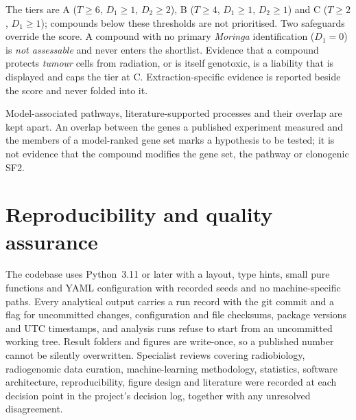 The tiers are A ($T\ge 6$, $D_1\ge 1$, $D_2\ge 2$), B ($T\ge 4$, $D_1\ge 1$, $D_2\ge 1$) and C
($T\ge 2$, $D_1\ge 1$); compounds below these thresholds are not prioritised. Two safeguards
override the score. A compound with no primary \textit{Moringa} identification ($D_1=0$) is
\emph{not assessable} and never enters the shortlist. Evidence that a compound protects
\emph{tumour} cells from radiation, or is itself genotoxic, is a liability that is displayed
and caps the tier at C. Extraction-specific evidence is reported beside the score and never
folded into it.

Model-associated pathways, literature-supported processes and their overlap are kept apart.
An overlap between the genes a published experiment measured and the members of a
model-ranked gene set marks a hypothesis to be tested; it is not evidence that the compound
modifies the gene set, the pathway or clonogenic SF2.

\section{Reproducibility and quality assurance}\label{sec:repro}

The codebase uses Python~3.11 or later with a  layout, type hints, small pure
functions and YAML configuration with recorded seeds and no machine-specific paths. Every
analytical output carries a run record with the git commit and a flag for uncommitted
changes, configuration and file checksums, package versions and UTC timestamps, and
analysis runs refuse to start from an uncommitted working tree. Result folders and figures
are write-once, so a published number cannot be silently overwritten. Specialist reviews
covering radiobiology, radiogenomic data curation, machine-learning methodology, statistics,
software architecture, reproducibility, figure design and literature were recorded at each
decision point in the project's decision log, together with any unresolved disagreement.
